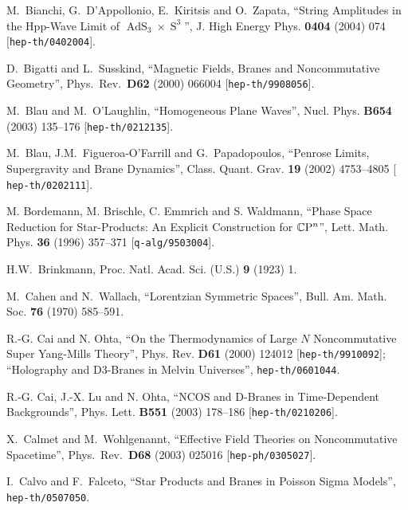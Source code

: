\documentclass[11pt,a4paper]{article}
\DeclareMathOperator{\AdS}{AdS}
\DeclareMathOperator{\Sphere}{S}
\let\S\Sphere
\newcommand{\1}{\mathbb{1}}
\newcommand{\complex}{{\mathbb C}} %
\begin{document}
\begin{thebibliography}{99}
 M.~Bianchi, G.~D'Appollonio, E.~Kiritsis and
  O.~Zapata, ``String Amplitudes in the Hpp-Wave Limit of
  $\AdS_3\times\S^3$'', J. High Energy Phys. {\bf 0404} (2004) 074
  [{\tt hep-th/0402004}].

  D.~Bigatti and L.~Susskind,
  ``Magnetic Fields, Branes and Noncommutative Geometry'',
  Phys.\ Rev.\  {\bf D62} (2000) 066004
  [{\tt hep-th/9908056}].

 M.~Blau and M.~O'Laughlin, ``Homogeneous Plane Waves'',
  Nucl. Phys. {\bf B654} (2003) 135--176 [{\tt hep-th/0212135}].

 M.~Blau, J.M.~Figueroa-O'Farrill and G.~Papadopoulos,
  ``Penrose Limits, Supergravity and Brane Dynamics'',
  Class. Quant. Grav. {\bf 19} (2002) 4753--4805 [{\tt
  hep-th/0202111}].

M. Bordemann, M. Brischle, C. Emmrich and S. Waldmann,
``Phase Space Reduction for Star-Products: An Explicit Construction
for $\complex{\rm P}^n$'', Lett. Math. Phys. {\bf 36} (1996) 357--371
[{\tt q-alg/9503004}].

 H.W.~Brinkmann, Proc. Natl. Acad. Sci. (U.S.) {\bf 9}
  (1923) 1.

 M.~Cahen and N.~Wallach, ``Lorentzian Symmetric
  Spaces'', Bull. Am. Math. Soc. {\bf 76} (1970) 585--591.

 R.-G. Cai and N. Ohta,
``On the Thermodynamics of Large $N$ Noncommutative Super Yang-Mills
Theory'',
Phys. Rev. {\bf D61} (2000) 124012 [{\tt hep-th/9910092}];
``Holography and D3-Branes in Melvin Universes'',
{\tt hep-th/0601044}.

R.-G. Cai, J.-X. Lu and N. Ohta,
``NCOS and D-Branes in Time-Dependent Backgrounds'',
Phys. Lett. {\bf B551} (2003) 178--186 [{\tt hep-th/0210206}].

  X.~Calmet and M.~Wohlgenannt,
  ``Effective Field Theories on Noncommutative Spacetime'',
  Phys.\ Rev.\  {\bf D68} (2003) 025016
  [{\tt hep-ph/0305027}].

  I.~Calvo and F.~Falceto,
  ``Star Products and Branes in Poisson Sigma Models'',
  {\tt hep-th/0507050}.


\end{thebibliography}
\end{document}
